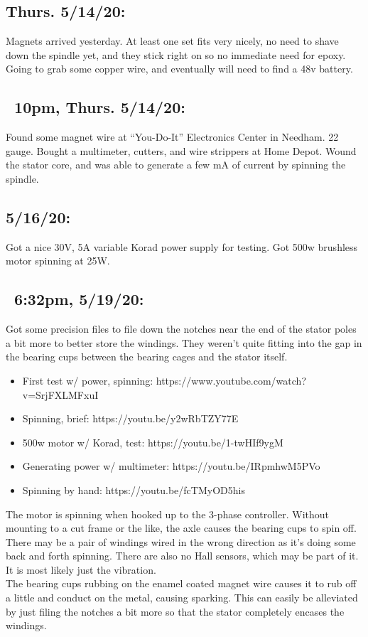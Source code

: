 \documentclass[11pt]{article} %
\begin{document}
\subsection*{Thurs. 5/14/20:} Magnets arrived yesterday. At least one set fits very nicely, no need to shave down the spindle yet, and they stick right on so no immediate need for epoxy. Going to grab some copper wire, and eventually will need to find a 48v battery. \\

\subsection*{~10pm, Thurs. 5/14/20:} Found some magnet wire at ``You-Do-It” Electronics Center in Needham. 22 gauge. Bought a multimeter, cutters, and wire strippers at Home Depot. Wound the stator core, and was able to generate a few mA of current by spinning the spindle. \\

\subsection*{5/16/20:} Got a nice 30V, 5A variable Korad power supply for testing. Got 500w brushless motor spinning at 25W. \\

\subsection*{~6:32pm, 5/19/20:} Got some precision files to file down the notches near the end of the stator poles a bit more to better store the windings. They weren’t quite fitting into the gap in the bearing cups between the bearing cages and the stator itself. \\

\begin{itemize}
\item First test w/ power, spinning: https://www.youtube.com/watch?v=SrjFXLMFxuI
\item Spinning, brief: https://youtu.be/y2wRbTZY77E
\item 500w motor w/ Korad, test: https://youtu.be/1-twHIf9ygM
\item Generating power w/ multimeter: https://youtu.be/IRpmhwM5PVo
\item Spinning by hand: https://youtu.be/fcTMyOD5his
\end{itemize}

The motor is spinning when hooked up to the 3-phase controller. Without mounting to a cut frame or the like, the axle causes the bearing cups to spin off. There may be a pair of windings wired in the wrong direction as it’s doing some back and forth spinning. There are also no Hall sensors, which may be part of it. It is most likely just the vibration. \\

The bearing cups rubbing on the enamel coated magnet wire causes it to rub off a little and conduct on the metal, causing sparking. This can easily be alleviated by just filing the notches a bit more so that the stator completely encases the windings. \\
\end{document}
